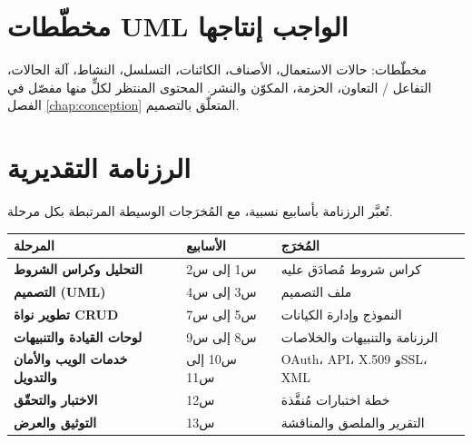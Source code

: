 \section{مخطّطات UML الواجب إنتاجها}
مخطّطات: حالات الاستعمال، الأصناف، الكائنات، التسلسل، النشاط، آلة الحالات،
التفاعل / التعاون، الحزمة، المكوّن والنشر. المحتوى المنتظر لكلٍّ منها مفصّل في
الفصل \ref{chap:conception} المتعلّق بالتصميم.

\section{الرزنامة التقديرية}
تُعبَّر الرزنامة بأسابيع نسبية، مع المُخرَجات الوسيطة المرتبطة بكل مرحلة.
\begin{xltabular}{\textwidth}{>{\bfseries}p{4.5cm} C{2.2cm} X}
\toprule
\textbf{المرحلة} & \textbf{الأسابيع} & \textbf{المُخرَج} \\
\midrule
\endhead
التحليل وكراس الشروط & س1 إلى س2 & كراس شروط مُصادَق عليه \\
التصميم (UML) & س3 إلى س4 & ملف التصميم \\
تطوير نواة CRUD & س5 إلى س7 & النموذج وإدارة الكيانات \\
لوحات القيادة والتنبيهات & س8 إلى س9 & الرزنامة والتنبيهات والخلاصات \\
خدمات الويب والأمان والتدويل & س10 إلى س11 & OAuth، API، X.509 وSSL، XML \\
الاختبار والتحقّق & س12 & خطة اختبارات مُنفَّذة \\
التوثيق والعرض & س13 & التقرير والملصق والمناقشة \\
\bottomrule
\end{xltabular}
